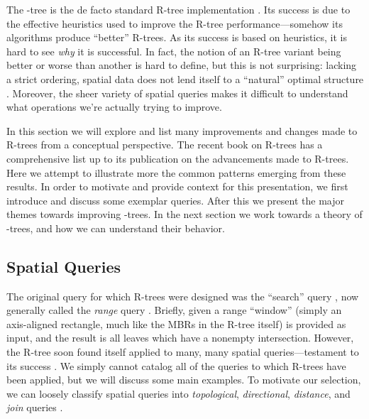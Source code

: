 \newcommand{\keyword}[1]{\textbf{#1}}


The \rstar-tree is the de facto standard R-tree implementation \cite{thebook}.
Its success is due to the effective heuristics used to improve the R-tree performance---somehow its algorithms produce ``better'' R-trees.
As its success is based on heuristics, it is hard to see \emph{why} it is successful.
In fact, the notion of an R-tree variant being better or worse than another is hard to define, but this is not surprising: lacking a strict ordering, spatial data does not lend itself to a ``natural'' optimal structure \cite{gaedegunther98}.
Moreover, the sheer variety of spatial queries makes it difficult to understand what operations we're actually trying to improve.

In this section we will explore and list many improvements and changes made to R-trees from a conceptual perspective.
The recent book on R-trees \cite{thebook} has a comprehensive list up to its publication on the advancements made to R-trees.
Here we attempt to illustrate more the common patterns emerging from these results.
In order to motivate and provide context for this presentation, we first introduce and discuss some exemplar queries.
After this we present the major themes towards improving \rbase-trees.
In the next section we work towards a theory of \rbase-trees, and how we can understand their behavior.

\subsection{Spatial Queries}
The original query for which R-trees were designed was the ``search'' query \cite{guttman84}, now generally called the \emph{range} query \cite{thebook}.
Briefly, given a range ``window'' (simply an axis-aligned rectangle, much like the MBRs in the R-tree itself) is provided as input, and the result is all leaves which have a nonempty intersection.
However, the R-tree soon found itself applied to many, many spatial queries---testament to its success \cite{thebook}.
We simply cannot catalog all of the queries to which R-trees have been applied, but we will discuss some main examples.
To motivate our selection, we can loosely classify spatial queries into \emph{topological}, \emph{directional}, \emph{distance}, and \emph{join} queries \cite{thebook,manolopoulos2003r}.


